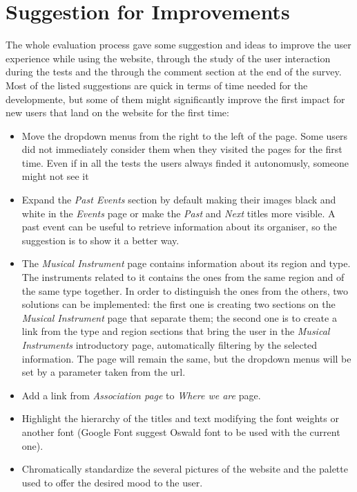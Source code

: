 \documentclass[../../UsabilityReport.tex]{subfiles}
\begin{document}
\section{Suggestion for Improvements}
	The whole evaluation process gave some suggestion and ideas to improve the user experience while using the website, through the study of the user interaction during the tests and the through the comment section at the end of the survey.
	Most of the listed suggestions are quick in terms of time needed for the developmente, but some of them might significantly improve the first impact for new users that land on the website for the first time:
	\begin{itemize}
		\item
			Move the dropdown menus from the right to the left of the page. Some users did not immediately consider them when they visited the pages for the first time. Even if in all the tests the users always finded it autonomusly, someone might not see it 
		\item
			Expand the \textit{Past Events} section by default making their images black and white in the \textit{Events} page or make the \textit{Past} and \textit{Next} titles more visible. A past event can be useful to retrieve information about its organiser, so the suggestion is to show it a better way.
		\item
			The \textit{Musical Instrument} page contains information about its region and type. The instruments related to it contains the ones from the same region and of the same type together. In order to distinguish the ones from the others, two solutions can be implemented: the first one is creating two sections on the \textit{Musical Instrument} page that separate them; the second one is to create a link from the type and region sections that bring the user in the \textit{Musical Instruments} introductory page, automatically filtering by the selected information. The page will remain the same, but the dropdown menus will be set by a parameter taken from the url.
		\item
			Add a link from \textit{Association page} to \textit{Where we are} page.
		\item
			Highlight the hierarchy of the titles and text modifying the font weights or another font (Google Font suggest Oswald font to be used with the current one).
		\item
			Chromatically standardize the several pictures of the website and the palette used to offer the desired mood to the user.
	\end{itemize}
\end{document}

